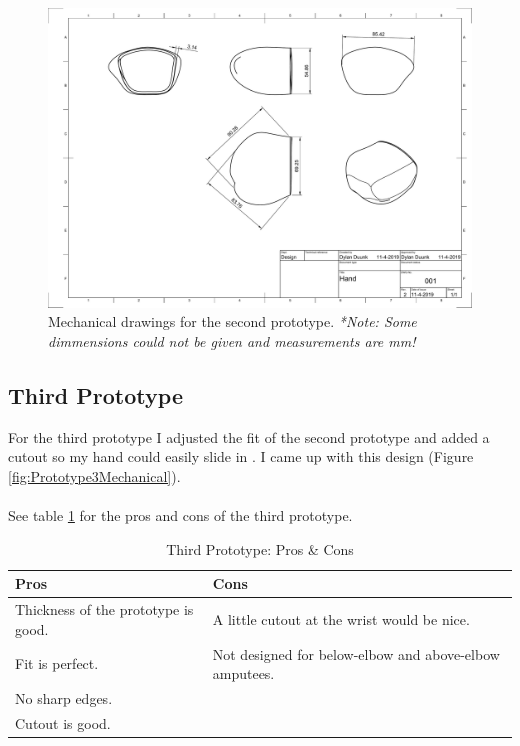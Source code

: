\documentclass[11pt, a4paper]{article}
\begin{document}
\begin{landscape}
    \thispagestyle{empty}
    \begin{figure}[h]
        \centering
        \includegraphics[scale=0.5]{Hand_Drawing_v1.pdf}
        \caption{Mechanical drawings for the second prototype. \textit{*Note: Some dimmensions could not be given and measurements are mm!}}
        \label{fig:Prototype2Mechanical}
    \end{figure} 
\end{landscape}

\subsection{Third Prototype}
For the third prototype I adjusted the fit of the second prototype and added a cutout so my hand could easily slide in .
I came up with this design (Figure \ref{fig:Prototype3Mechanical}).
\\ \\
See table \ref{tab:ThirdPrototypeProsCons} for the pros and cons of the third prototype.
\begin{table}[ht]
    \centering
    \begin{tabular}[t]{p{6cm} p{6cm}}
    \toprule
    \textbf{Pros} & \textbf{Cons} \\
    \midrule
    Thickness of the prototype is good. & A little cutout at the wrist would be nice. \\
    Fit is perfect. & Not designed for below-elbow and above-elbow amputees. \\ 
    No sharp edges. & \\
    Cutout is good. & \\
    \bottomrule
    \end{tabular}
    \caption{Third Prototype: Pros \& Cons}
    \label{tab:ThirdPrototypeProsCons}
\end{table}
\end{document}
